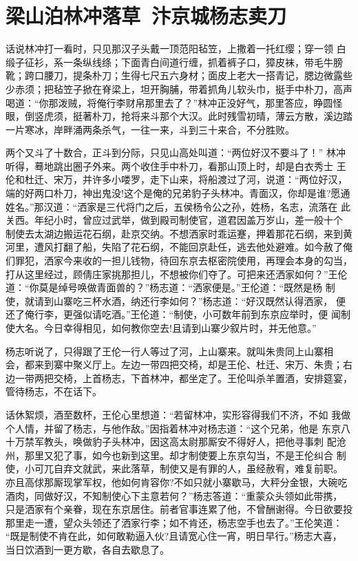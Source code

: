 \chapter{梁山泊林冲落草~汴京城杨志卖刀}

话说林冲打一看时，只见那汉子头戴一顶范阳毡笠，上撒着一托红缨；穿一领
白缎子征衫，系一条纵线绦；下面青白间道行缠，抓着裤子口，獐皮袜，带毛牛膀
靴；跨口腰刀，提条朴刀；生得七尺五六身材；面皮上老大一搭青记，腮边微露些
少赤须；把毡笠子掀在脊梁上，坦开胸脯，带着抓角儿软头巾，挺手中朴刀，高声
喝道：“你那泼贼，将俺行李财帛那里去了？”林冲正没好气，那里答应，睁圆怪
眼，倒竖虎须，挺著朴刀，抢将来斗那个大汉。此时残雪初晴，薄云方散，溪边踏
一片寒冰，岸畔涌两条杀气，一往一来，斗到三十来合，不分胜败。

两个又斗了十数合，正斗到分际，只见山高处叫道：“两位好汉不要斗了！”
林冲听得，蓦地跳出圈子外来。两个收住手中朴刀，看那山顶上时，却是白衣秀士
王伦和杜迁、宋万，并许多小喽罗，走下山来，将船渡过了河，说道：“两位好汉，
端的好两口朴刀，神出鬼没!这个是俺的兄弟豹子头林冲。青面汉，你却是谁?愿通
姓名。”那汉道：“洒家是三代将门之后，五侯杨令公之孙，姓杨，名志，流落在
此关西。年纪小时，曾应过武举，做到殿司制使官，道君因盖万岁山，差一般十个
制使去太湖边搬运花石纲，赴京交纳。不想洒家时乖运蹇，押着那花石纲，来到黄
河里，遭风打翻了船，失陷了花石纲，不能回京赴任，逃去他处避难。如今赦了俺
们罪犯，洒家今来收的一担儿钱物，待回东京去枢密院使用，再理会本身的勾当，
打从这里经过，顾倩庄家挑那担儿，不想被你们夺了。可把来还洒家如何？”王伦
道：“你莫是绰号唤做青面兽的？”杨志道：“洒家便是。”王伦道：“既然是杨
制使，就请到山寨吃三杯水酒，纳还行李如何？”杨志道：“好汉既然认得洒家，
便还了俺行李，更强似请吃酒。”王伦道：“制使，小可数年前到东京应举时，便
闻制使大名。今日幸得相见，如何教你空去!且请到山寨少叙片时，并无他意。”

杨志听说了，只得跟了王伦一行人等过了河，上山寨来。就叫朱贵同上山寨相
会，都来到寨中聚义厅上。左边一带四把交椅，却是王伦、杜迁、宋万、朱贵；右
边一带两把交椅，上首杨志，下首林冲，都坐定了。王伦叫杀羊置酒，安排筵宴，
管待杨志，不在话下。

话休絮烦，酒至数杯，王伦心里想道：“若留林冲，实形容得我们不济，不如
我做个人情，并留了杨志，与他作敌。”因指着林冲对杨志道：“这个兄弟，他是
东京八十万禁军教头，唤做豹子头林冲，因这高太尉那厮安不得好人，把他寻事刺
配沧州，那里又犯了事，如今也新到这里。却才制使要上东京勾当，不是王伦纠合
制使，小可兀自弃文就武，来此落草，制使又是有罪的人，虽经赦宥，难复前职。
亦且高俅那厮现掌军权，他如何肯容你?不如只就小寨歇马，大秤分金银，大碗吃
酒肉，同做好汉，不知制使心下主意若何？”杨志答道：“重蒙众头领如此带携，
只是洒家有个亲眷，现在东京居住。前者官事连累了他，不曾酬谢得。今日欲要投
那里走一遭，望众头领还了洒家行李；如不肯还，杨志空手也去了。”王伦笑道：
“既是制使不肯在此，如何敢勒逼入伙?且请宽心住一宵，明日早行。”杨志大喜，
当日饮酒到一更方歇，各自去歇息了。

